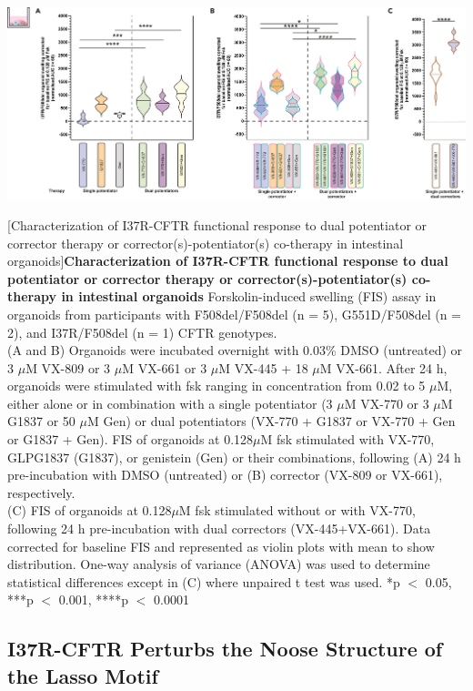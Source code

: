 \begin{center}
\includegraphics[width=\textwidth]{figures/I37R/rectal_organoids_triple_therapy.jpg}
\label{I37R_figure3}
\end{center}
\begingroup
{}[Characterization of I37R-CFTR functional response to dual potentiator or corrector therapy or corrector(s)-potentiator(s) co-therapy in intestinal organoids]{\textbf{Characterization of I37R-CFTR functional response to dual potentiator or corrector therapy or corrector(s)-potentiator(s) co-therapy in intestinal organoids}}{
	Forskolin-induced swelling (FIS) assay in organoids from participants with F508del/F508del (n = 5), G551D/F508del (n = 2), and I37R/F508del (n = 1) CFTR genotypes.\\

	(A and B) Organoids were incubated overnight with 0.03\% DMSO (untreated) or 3 $\mu$M VX-809 or 3 $\mu$M VX-661 or 3 $\mu$M VX-445 + 18 $\mu$M VX-661. After 24 h, organoids were stimulated with fsk ranging in concentration from 0.02 to 5 $\mu$M, either alone or in combination with a single potentiator (3 $\mu$M VX-770 or 3 $\mu$M G1837 or 50 $\mu$M Gen) or dual potentiators (VX-770 + G1837 or VX-770 + Gen or G1837 + Gen). FIS of organoids at 0.128$\mu$M fsk stimulated with VX-770, GLPG1837 (G1837), or genistein (Gen) or their combinations, following (A) 24 h pre-incubation with DMSO (untreated) or (B) corrector (VX-809 or VX-661), respectively.\\

	(C) FIS of organoids at 0.128$\mu$M fsk stimulated without or with VX-770, following 24 h pre-incubation with dual correctors (VX-445+VX-661). Data corrected for baseline FIS and represented as violin plots with mean to show distribution. One-way analysis of variance (ANOVA) was used to determine statistical differences except in (C) where unpaired t test was used. *p $<$ 0.05, ***p $<$ 0.001, ****p $<$ 0.0001
}
\endgroup

\subsection{I37R-CFTR Perturbs the Noose Structure of the Lasso Motif}

